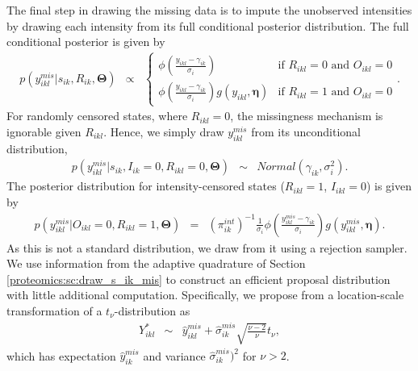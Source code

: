 The final step in drawing the missing data is to impute the unobserved intensities by drawing each intensity from its full conditional posterior distribution.
The full conditional posterior is given by
\begin{eqnarray*}
p(y_{ikl}^{mis}\vert s_{ik}, R_{ik},\bm{\Theta}) & \propto & \begin{cases}
\phi\left(\frac{y_{ikl} - \gamma_{ik}}{\sigma_{i}}\right) & \text{if }R_{ikl}=0 \text{ and }O_{ikl}=0\\
\phi\left(\frac{y_{ikl} - \gamma_{ik}}{\sigma_{i}}\right) g(y_{ikl}, \bm \eta) & \text{if }R_{ikl}=1 \text{ and }O_{ikl}=0
\end{cases} .
\end{eqnarray*}
For randomly censored states, where $R_{ikl}=0$, the missingness mechanism is ignorable given $R_{ikl}$.
Hence, we simply draw $y_{ikl}^{mis}$ from its unconditional distribution,
\begin{eqnarray*}
p(y_{ikl}^{mis}\vert s_{ik}, I_{ik}=0, R_{ikl}=0, \bm{\Theta}) & \sim & Normal(\gamma_{ik},\sigma_{i}^{2}).
\end{eqnarray*}
%
The posterior distribution for intensity-censored states ($R_{ikl}=1$, $I_{ikl}=0$) is given by
\begin{eqnarray}
p(y_{ikl}^{mis}\vert O_{ikl}=0,R_{ikl}=1,\bm{\Theta}) & = & (\pi_{ik}^{int})^{-1}\frac{1}{\sigma_{i}} \phi\left(\frac{y_{ikl}^{mis}-\gamma_{ik}}{\sigma_{i}}\right) g(y_{ikl}^{mis}, \bm \eta) .
\label{proteomics:eq:intensity-censored-posterior-text}
\end{eqnarray}
As this is not a standard distribution, we draw from it using a rejection sampler.
We use information from the adaptive quadrature of Section \ref{proteomics:sc:draw_s_ik_mis} to construct an efficient proposal distribution with little additional computation.
Specifically, we propose from a location-scale transformation of a $t_{\nu}$-distribution as
\begin{eqnarray}
Y_{ikl}^{*} & \sim & \hat{y}_{ikl}^{mis}+\hat{\sigma}_{ik}^{mis} \sqrt{\frac{\nu-2}{\nu}} t_{\nu},
\end{eqnarray}
which has expectation $\hat{y}_{ik}^{mis}$ and variance $\hat{\sigma}_{ik}^{mis})^{2}$ for $\nu>2$.

